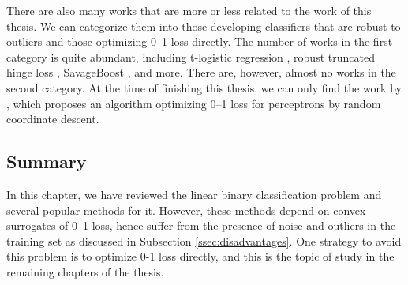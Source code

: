 There are also many works that are more or less related to the work of this thesis. We can categorize them into those developing classifiers that are robust to outliers and those optimizing 0--1 loss directly. The number of works in the first category is quite abundant, including t-logistic regression \cite{Ding}, robust truncated hinge loss \cite{robusthinge}, SavageBoost \cite{lossdesign}, and more. There are, however, almost no works in the second category. At the time of finishing this thesis, we can only find the work by \cite{ling}, which proposes an algorithm optimizing 0--1 loss for perceptrons by random coordinate descent. 


\subsection{Summary}
\label{sec:bgr.summary}

In this chapter, we have reviewed the linear binary classification problem and several popular methods for it. However, these methods depend on convex surrogates of 0--1 loss, hence suffer from the presence of noise and outliers in the training set as discussed in Subsection \ref{ssec:disadvantages}. One strategy to avoid this problem is to optimize 0-1 loss directly, and this is the topic of study in the remaining chapters of the thesis. 

